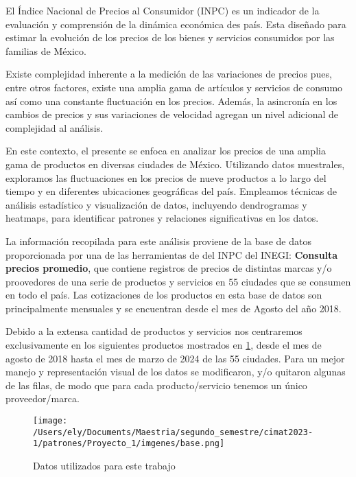 \documentclass[letterpaper,spanish,reprint,nofootinbib,showkeys,aps]{revtex4-2}
\begin{document}
El Índice Nacional de Precios al Consumidor (INPC) es un indicador de la evaluación y comprensión de la dinámica económica des país. Esta diseñado para estimar la evolución de los precios de los bienes y servicios consumidos por las familias de México.

Existe complejidad inherente a la medición de las variaciones de precios pues, entre otros factores, existe una amplia gama de artículos y servicios de consumo así como una constante fluctuación en los precios. Además, la asincronía en los cambios de precios y sus variaciones de velocidad agregan un nivel adicional de complejidad al análisis.

En este contexto, el presente se enfoca en analizar los precios de una amplia gama de productos en diversas ciudades de México. Utilizando datos muestrales, exploramos las fluctuaciones en los precios de nueve productos a lo largo del tiempo y en diferentes ubicaciones geográficas del país. Empleamos técnicas de análisis estadístico y visualización de datos, incluyendo dendrogramas y heatmaps, para identificar patrones y relaciones significativas en los datos.

La información recopilada para este análisis proviene de la base de datos proporcionada por una de las herramientas de del INPC del INEGI: \textbf{Consulta precios promedio}, que contiene registros de precios de distintas marcas y/o proovedores de una serie de productos y servicios en 55 ciudades que se consumen en todo el país. Las cotizaciones de los productos en esta base de datos son principalmente mensuales y se encuentran desde el mes de Agosto del año 2018.

Debido a la extensa cantidad de productos y servicios nos centraremos exclusivamente en los siguientes productos mostrados en \ref{base}, desde el mes de agosto de 2018 hasta el mes de marzo de 2024 de las 55 ciudades. Para un mejor manejo y representación visual de los datos se modificaron, y/o quitaron
algunas de las filas, de modo que para cada producto/servicio tenemos un único proveedor/marca. 



\begin{figure} [H]
	\begin{center}
		\texttt{[image: /Users/ely/Documents/Maestria/segundo\_semestre/cimat2023-1/patrones/Proyecto\_1/imgenes/base.png]}
		\caption{Datos utilizados para este trabajo}
		\label{base} 
   \end{center} 
\end{figure}
\end{document}
